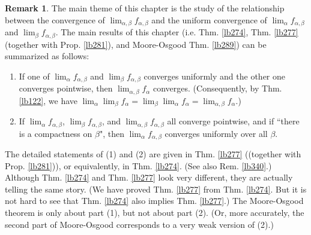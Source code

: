 \documentclass[12pt,b5paper,notitlepage]{article}
\theoremstyle{definition}
\newtheorem{rem}[df]{Remark}
\theoremstyle{plain}
\numberwithin{equation}{section}
\begin{document}
\begin{rem}
The main theme of this chapter is the study of the relationship between the convergence of $\lim_{\alpha,\beta}f_{\alpha,\beta}$ and the uniform convergence of $\lim_\alpha f_{\alpha,\beta}$ and $\lim_\beta f_{\alpha,\beta}$. The main results of this chapter (i.e. Thm. \ref{lb274}, Thm. \ref{lb277} (together with Prop. \ref{lb281}), and Moore-Osgood Thm. \ref{lb289}) can be summarized as follows:
\begin{enumerate}
\item[(1)] If one of $\lim_\alpha f_{\alpha,\beta}$ and $\lim_\beta f_{\alpha,\beta}$ converges uniformly and the other one converges pointwise, then $\lim_{\alpha,\beta}f_{\alpha}$ converges. (Consequently, by Thm. \ref{lb122}, we have $\lim_\alpha\lim_\beta f_{\alpha}=\lim_\beta\lim_\alpha f_{\alpha}=\lim_{\alpha,\beta}f_{\alpha}$.)
\item[(2)] If $\lim_\alpha f_{\alpha,\beta}$, $\lim_\beta f_{\alpha,\beta}$, and $\lim_{\alpha,\beta}f_{\alpha,\beta}$ all converge pointwise, and if ``there is a compactness on $\beta$", then $\lim_\alpha f_{\alpha,\beta}$ converges uniformly over all $\beta$.
\end{enumerate}
The detailed statements of (1) and (2) are given in Thm. \ref{lb277} ((together with Prop. \ref{lb281})), or equivalently, in Thm. \ref{lb274}. (See also Rem. \ref{lb340}.) Although Thm. \ref{lb274} and Thm. \ref{lb277} look very different, they are actually telling the same story. (We have proved Thm. \ref{lb277} from Thm. \ref{lb274}. But it is not hard to see that Thm. \ref{lb274} also implies Thm. \ref{lb277}.) The Moore-Osgood theorem is only about part (1), but not about part (2). (Or, more accurately, the second part of Moore-Osgood corresponds to a very weak version of (2).)
\end{rem}











\end{document}
